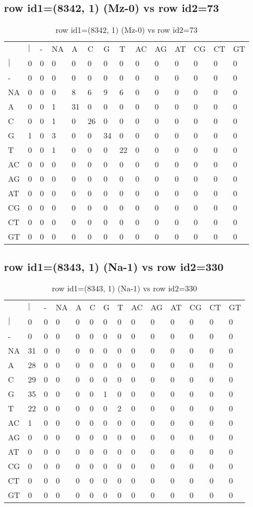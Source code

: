 \subsection{row id1=(8342, 1) (Mz-0) vs row id2=73}
\begin{center}
\begin{longtable}{|l|l|l|l|l|l|l|l|l|l|l|l|l|l|}
\caption{row id1=(8342, 1) (Mz-0) vs row id2=73} \label{table_dm550}\\
\hline
\\
\hline
&$|$&-&NA&A&C&G&T&AC&AG&AT&CG&CT&GT\\
$|$&0&0&0&0&0&0&0&0&0&0&0&0&0\\
-&0&0&0&0&0&0&0&0&0&0&0&0&0\\
NA&0&0&0&8&6&9&6&0&0&0&0&0&0\\
A&0&0&1&31&0&0&0&0&0&0&0&0&0\\
C&0&0&1&0&26&0&0&0&0&0&0&0&0\\
G&1&0&3&0&0&34&0&0&0&0&0&0&0\\
T&0&0&1&0&0&0&22&0&0&0&0&0&0\\
AC&0&0&0&0&0&0&0&0&0&0&0&0&0\\
AG&0&0&0&0&0&0&0&0&0&0&0&0&0\\
AT&0&0&0&0&0&0&0&0&0&0&0&0&0\\
CG&0&0&0&0&0&0&0&0&0&0&0&0&0\\
CT&0&0&0&0&0&0&0&0&0&0&0&0&0\\
GT&0&0&0&0&0&0&0&0&0&0&0&0&0\\
\hline
\end{longtable}
\end{center}

\subsection{row id1=(8343, 1) (Na-1) vs row id2=330}
\begin{center}
\begin{longtable}{|l|l|l|l|l|l|l|l|l|l|l|l|l|l|}
\caption{row id1=(8343, 1) (Na-1) vs row id2=330} \label{table_dm552}\\
\hline
\\
\hline
&$|$&-&NA&A&C&G&T&AC&AG&AT&CG&CT&GT\\
$|$&0&0&0&0&0&0&0&0&0&0&0&0&0\\
-&0&0&0&0&0&0&0&0&0&0&0&0&0\\
NA&31&0&0&0&0&0&0&0&0&0&0&0&0\\
A&28&0&0&0&0&0&0&0&0&0&0&0&0\\
C&29&0&0&0&0&0&0&0&0&0&0&0&0\\
G&35&0&0&0&0&1&0&0&0&0&0&0&0\\
T&22&0&0&0&0&0&2&0&0&0&0&0&0\\
AC&1&0&0&0&0&0&0&0&0&0&0&0&0\\
AG&0&0&0&0&0&0&0&0&0&0&0&0&0\\
AT&0&0&0&0&0&0&0&0&0&0&0&0&0\\
CG&0&0&0&0&0&0&0&0&0&0&0&0&0\\
CT&0&0&0&0&0&0&0&0&0&0&0&0&0\\
GT&0&0&0&0&0&0&0&0&0&0&0&0&0\\
\hline
\end{longtable}
\end{center}


